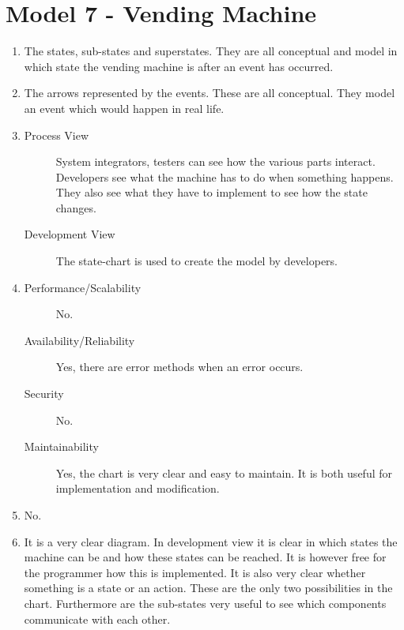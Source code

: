 \section{Model 7 - Vending Machine}
\begin{enumerate}
	\item The states, sub-states and superstates.
	They are all conceptual and model in which state the vending machine is after an event has occurred.
	
	\item The arrows represented by the events. 
	These are all conceptual. 
	They model an event which would happen in real life.
	
	\item 
	\begin{description}
		\item[Process View] System integrators, testers can see how the various parts interact.
		Developers see what the machine has to do when something happens. They also see what they have to implement to see how the state changes.
		\item[Development View] The state-chart is used to create the model by developers.
	\end{description}
	
	\item 
	\begin{description}
		\item[Performance/Scalability] No.
		\item[Availability/Reliability] Yes, there are error methods when an error occurs.
		\item[Security] No.
		\item[Maintainability] Yes, the chart is very clear and easy to maintain. 
		It is both useful for implementation and modification.
	\end{description}
	
	\item No.
	
	\item It is a very clear diagram. 
	In development view it is clear in which states the machine can be and how these states can be reached. 
	It is however free for the programmer how this is implemented. 
	It is also very clear whether something is a state or an action. 
	These are the only two possibilities in the chart.
	Furthermore are the sub-states very useful to see which components communicate with each other.
\end{enumerate}
